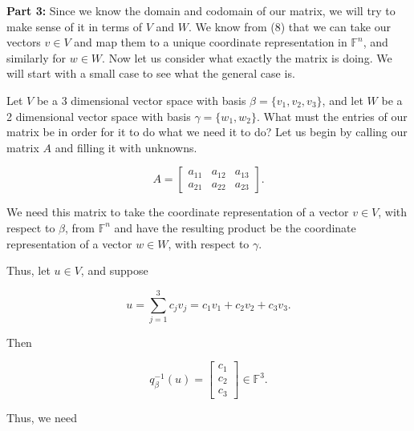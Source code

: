 \documentclass[12pt, a4paper]{article}
\begin{document}
 \vspace{4mm}
 
 \noindent\textbf{Part 3:} Since we know the domain and codomain of our matrix, we will try to make sense of it in terms of $V$ and $W$. We know from (8) that we can take our vectors $v\in V$ and map them to a unique coordinate representation in $\mathbb{F}^n$, and similarly for $w\in W$. Now let us consider what exactly the matrix is doing. We will start with a small case to see what the general case is.\par
 Let $V$ be a 3 dimensional vector space with basis $\beta=\{v_1,v_2,v_3\}$, and let $W$ be a 2 dimensional vector space with basis $\gamma=\{w_1,w_2\}$. What must the entries of our matrix be in order for it to do what we need it to do? Let us begin by calling our matrix $A$ and filling it with unknowns.
 
 \begin{equation*}
     A=\begin{bmatrix} a_{11} & a_{12} & a_{13} \\ a_{21} & a_{22} & a_{23} \end{bmatrix}.
 \end{equation*}
 
 \vspace{2mm}
 
 \noindent We need this matrix to take the coordinate representation of a vector $v\in V$,  with respect to $\beta$, from $\mathbb{F}^n$ and have the resulting product be the coordinate representation of a vector $w\in W$, with respect to $\gamma$.
 
 \newpage
 
 \noindent Thus, let $u\in V$, and suppose 
 
 \begin{equation*}
     u=\sum_{j=1}^3c_jv_j=c_1v_1+c_2v_2+c_3v_3.
 \end{equation*}
 
 \noindent Then 
 
 \begin{equation*}
     q_{\beta}^{-1}(u)=\begin{bmatrix} c_1 \\ c_2 \\ c_3 \end{bmatrix}\in\mathbb{F}^3.
 \end{equation*}
 
 \vspace{2mm}
 
 \noindent Thus, we need
 
\end{document}
